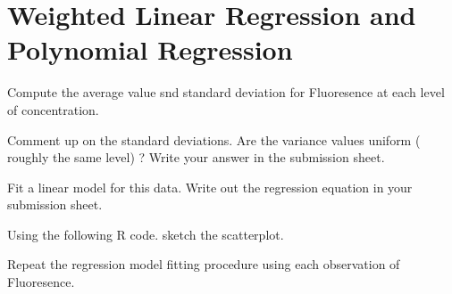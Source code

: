 
\section*{Weighted Linear Regression and Polynomial Regression}

Compute the average value snd standard deviation for Fluoresence at each level of concentration.

Comment up on the standard deviations. Are the variance values uniform ( roughly the same level) ? Write your answer in the submission sheet.

Fit a linear model for this data. Write out the regression equation in your submission sheet.

Using the following R code. sketch the scatterplot.

Repeat the regression model fitting procedure using each observation of Fluoresence. 

